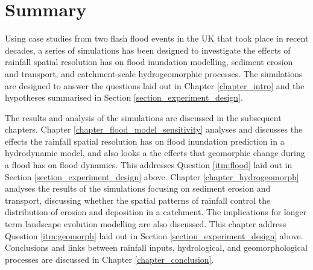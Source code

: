 


%

\section{Summary}

Using case studies from two flash flood events in the UK that took place in recent decades, a series of simulations has been designed to investigate the effects of rainfall spatial resolution has on flood inundation modelling, sediment erosion and transport, and catchment-scale hydrogeomorphic processes. The simulations are designed to answer the questions laid out in Chapter \ref{chapter_intro} and the hypotheses summarised in Section \ref{section_experiment_design}. 

The results and analysis of the simulations are discussed in the subsequent chapters. Chapter \ref{chapter_flood_model_sensitivity} analyses and discusses the effects the rainfall spatial resolution has on flood inundation prediction in a hydrodynamic model, and also looks a the effects that geomorphic change during a flood has on flood dynamics. This addresses Question \ref{itm:flood} laid out in Section \ref{section_experiment_design} above. Chapter \ref{chapter_hydrogeomorph} analyses the results of the simulations focusing on sediment erosion and transport, discussing whether the spatial patterns of rainfall control the distribution of erosion and deposition in a catchment. The implications for longer term landscape evolution modelling are also discussed. This chapter address Question \ref{itm:geomorph} laid out in Section \ref{section_experiment_design} above. Conclusions and links between rainfall inputs, hydrological, and geomorphological processes are discussed in Chapter \ref{chapter_conclusion}.
